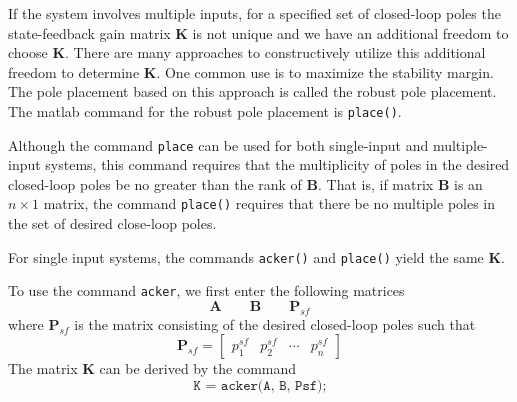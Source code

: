 \documentclass[12pt,a4paper,oneside]{book}
\begin{document}
\begin{onehalfspace}
If the system involves multiple inputs, for a specified set of closed-loop poles the state-feedback gain matrix $\mathbf{K}$ is not unique and we have an additional freedom to choose $\mathbf{K}$. There are many approaches to constructively utilize this additional freedom to determine $\mathbf{K}$. One common use is to maximize the stability margin. The pole placement based on this approach is called the robust pole placement. The matlab command for the robust pole placement is \texttt{place()}. 

Although the command \texttt{place} can be used for both single-input and multiple-input systems, this command requires that the multiplicity of poles in the desired closed-loop poles be no greater than the rank of $\mathbf{B}$. That is, if matrix $\mathbf{B}$ is an $n\times 1$ matrix, the command \texttt{place()} requires that there be no multiple poles in the set of desired close-loop poles.

For single input systems, the commands \texttt{acker()} and \texttt{place()} yield the same $\mathbf{K}$.

To use the command \texttt{acker}, we first enter the following matrices 
\begin{equation*}
	\mathbf{A}\qquad\mathbf{B}\qquad\mathbf{P}_{sf}
\end{equation*}
where $\mathbf{P}_{sf}$ is the matrix consisting of the desired closed-loop poles such that 
\begin{equation*}
	\mathbf{P}_{sf}=\begin{bmatrix}p_1^{sf} & p_2^{sf} & \cdots & p_n^{sf}\end{bmatrix}
\end{equation*}
The matrix $\mathbf{K}$ can be derived by the command
$$\texttt{K = acker(A, B, Psf);}$$


\end{onehalfspace}
\end{document}
